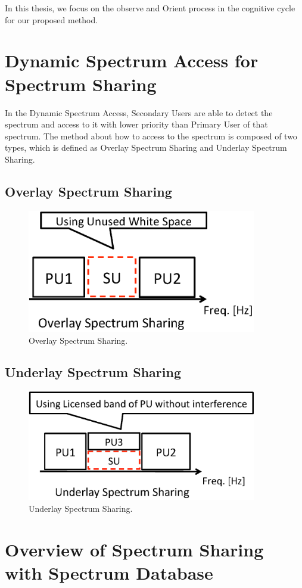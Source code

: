 In this thesis, we focus on the observe and Orient process in the cognitive cycle for our proposed method.


\section{Dynamic Spectrum Access for Spectrum Sharing}
In the Dynamic Spectrum Access, Secondary Users are able to detect the spectrum and access to it with lower priority than Primary User of that spectrum. The method about how to access to the spectrum is composed of two types, which is defined as Overlay Spectrum Sharing \cite{ref:overlay}and Underlay Spectrum Sharing\cite{ref:underlay}.

\subsection{Overlay Spectrum Sharing}

\begin{figure}[!htp]
\begin{center}
\includegraphics[width=100mm,clip]{overlay.eps}
\caption{Overlay Spectrum Sharing.}
\label{fig:overlay}
\end{center}
\end{figure}

\subsection{Underlay Spectrum Sharing}

\begin{figure}[!htp]
\begin{center}
\includegraphics[width=100mm,clip]{underlay.eps}
\caption{Underlay Spectrum Sharing.}
\label{fig:underlay}
\end{center}
\end{figure}

\section{Overview of Spectrum Sharing with Spectrum Database}
